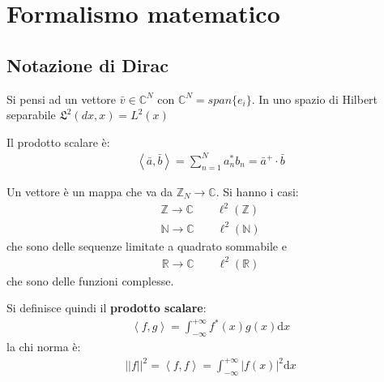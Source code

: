 \chapter{Formalismo matematico} %
\section{Notazione di Dirac}
Si pensi ad un vettore $\bar v\in \mathbb{C} ^N$ con $\mathbb{C} ^N=span\{e_i\}$. In uno spazio di Hilbert separabile $\mathfrak{L}^2\left(dx, x\right)=L^2\left(x\right)$

Il prodotto scalare è:
\begin{equation}\begin{split}
\left\langle \bar a,\bar b \right\rangle=\sum_{n=1}^{N}{a^*_nb_n}=\bar a^+\cdot \bar b
\end{split}\end{equation}

Un vettore è un mappa che va da $\mathbb{Z}_N \rightarrow \mathbb{C} $. 
Si hanno i casi:
\begin{equation}\begin{split}
\mathbb{Z} \rightarrow \mathbb{C} \qquad \ell^2\left(\mathbb{Z}\right) \\
\mathbb{N} \rightarrow \mathbb{C} \qquad \ell^2\left(\mathbb{N}\right)
\end{split}\end{equation}
che sono delle sequenze limitate a quadrato sommabile e
\begin{equation}\begin{split}
\mathbb{R} \rightarrow \mathbb{C} \qquad \ell^2\left(\mathbb{R}\right)
\end{split}\end{equation}
che sono delle funzioni complesse.

Si definisce quindi il \textbf{prodotto scalare}:
\begin{equation}\begin{split}
\left\langle f,g \right\rangle=\int_{-\infty }^{+\infty }{f^*\left(x\right)g\left(x\right) \textrm{d}x}
\end{split}\end{equation}
la chi norma è:
\begin{equation}\begin{split}
||f||^2=\left\langle f,f \right\rangle=\int_{-\infty }^{+\infty }{|f\left(x\right)|^2 \textrm{d}x}
\end{split}\end{equation}

